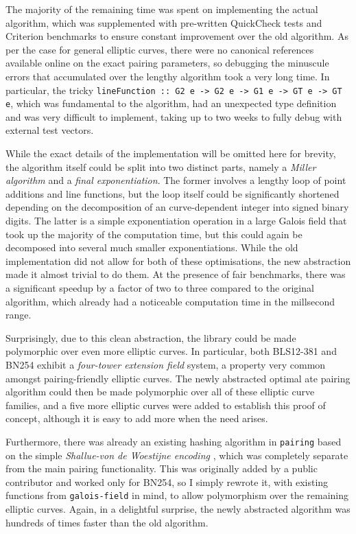 \documentclass[11pt]{article}
\begin{document}
The majority of the remaining time was spent on implementing the actual algorithm, which was supplemented with pre-written QuickCheck tests and Criterion benchmarks to ensure constant improvement over the old algorithm. As per the case for general elliptic curves, there were no canonical references available online on the exact pairing parameters, so debugging the minuscule errors that accumulated over the lengthy algorithm took a very long time. In particular, the tricky \texttt{lineFunction :: G2 e -> G2 e -> G1 e -> GT e -> GT e}, which was fundamental to the algorithm, had an unexpected type definition and was very difficult to implement, taking up to two weeks to fully debug with external test vectors.

While the exact details of the implementation will be omitted here for brevity, the algorithm itself could be split into two distinct parts, namely a \emph{Miller algorithm} and a \emph{final exponentiation}. The former involves a lengthy loop of point additions and line functions, but the loop itself could be significantly shortened depending on the decomposition of an curve-dependent integer into signed binary digits. The latter is a simple exponentiation operation in a large Galois field that took up the majority of the computation time, but this could again be decomposed into several much smaller exponentiations. While the old implementation did not allow for both of these optimisations, the new abstraction made it almost trivial to do them. At the presence of fair benchmarks, there was a significant speedup by a factor of two to three compared to the original algorithm, which already had a noticeable computation time in the millsecond range.

Surprisingly, due to this clean abstraction, the library could be made polymorphic over even more elliptic curves. In particular, both BLS12-381 and BN254 exhibit a \emph{four-tower extension field} system, a property very common amongst pairing-friendly elliptic curves. The newly abstracted optimal ate pairing algorithm could then be made polymorphic over all of these elliptic curve families, and a five more elliptic curves were added to establish this proof of concept, although it is easy to add more when the need arises.

Furthermore, there was already an existing hashing algorithm in \texttt{pairing} based on the simple \emph{Shallue-von de Woestijne encoding} \cite{fouque}, which was completely separate from the main pairing functionality. This was originally added by a public contributor and worked only for BN254, so I simply rewrote it, with existing functions from \texttt{galois-field} in mind, to allow polymorphism over the remaining elliptic curves. Again, in a delightful surprise, the newly abstracted algorithm was hundreds of times faster than the old algorithm.
\end{document}
